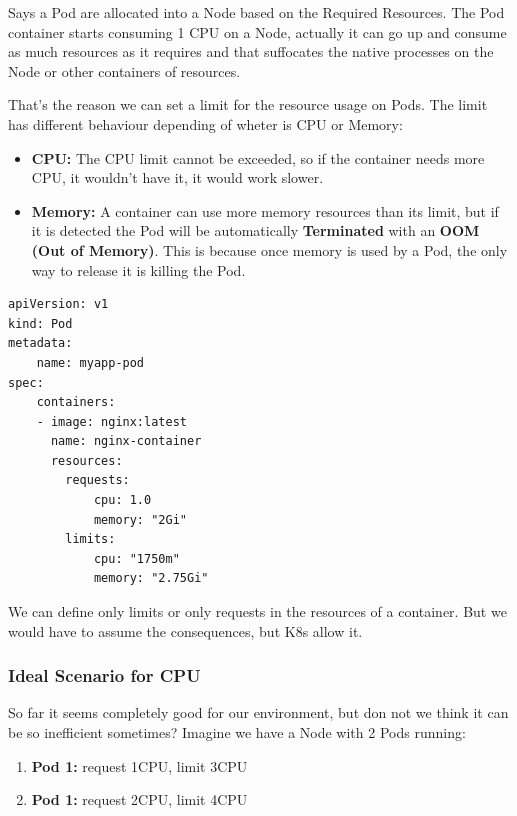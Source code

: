 \documentclass{article}
\newenvironment{blocktemplateII}[1]{%
    \tcolorbox[beamer,%
    noparskip,breakable,
    colframe=Green,%
    colbacklower=LimeGreen!75!LightGreen,%
    title=#1]}%
    {\endtcolorbox}
\newenvironment{codetemplate}[1][]{%
  \mybasecolorbox[#1]
  \itshape
}{%
  \endmybasecolorbox
}
\begin{document}
Says a Pod are allocated into a Node based on the Required Resources. The Pod container starts consuming 1 CPU on a Node, actually it can go up and consume as much resources as it requires and that suffocates the native processes on the Node or other containers of resources.

That's the reason we can set a limit for the resource usage on Pods. The limit has different behaviour depending of wheter is CPU or Memory:
\begin{itemize}
    \item \textbf{CPU:} The CPU limit cannot be exceeded, so if the container needs more CPU, it wouldn't have it, it would work slower.
    \item \textbf{Memory:} A container can use more memory resources than its limit, but if it is detected the Pod will be automatically \textbf{Terminated} with an \textbf{OOM (Out of Memory)}. This is because once memory is used by a Pod, the only way to release it is killing the Pod.
\end{itemize}

\begin{codetemplate}{}
\begin{verbatim}
apiVersion: v1
kind: Pod
metadata:
    name: myapp-pod
spec:
    containers:
    - image: nginx:latest
      name: nginx-container
      resources:
        requests:
            cpu: 1.0
            memory: "2Gi"
        limits:
            cpu: "1750m"
            memory: "2.75Gi"
\end{verbatim}
\end{codetemplate}

\begin{blocktemplateII}{NOTE}
We can define only limits or only requests in the resources of a container. But we would have to assume the consequences, but K8s allow it.
\end{blocktemplateII}

\subsubsection{Ideal Scenario for CPU}
So far it seems completely good for our environment, but don not we think it can be so inefficient sometimes? Imagine we have a Node with 2 Pods running:
\begin{enumerate}
    \item \textbf{Pod 1:} request 1CPU, limit 3CPU
    \item \textbf{Pod 1:} request 2CPU, limit 4CPU
\end{enumerate}
\end{document}
